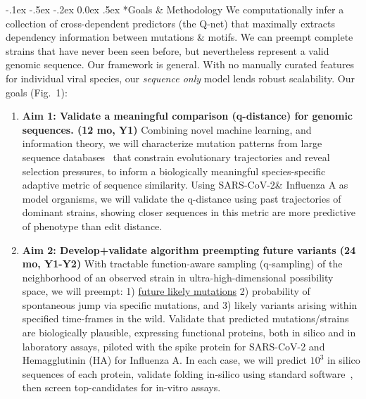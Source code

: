 \documentclass[onecolumn, compsoc,12pt]{IEEEtran}
\makeatletter
\renewcommand\paragraph{\@startsection {section}{1}{\z@}%
                                   {-.1ex \@plus -.5ex \@minus -.2ex}%
                                   {0.0ex \@plus.5ex}%
                                   {\fontsize{11}{10}\selectfont\bfseries\itshape\sffamily\color{black}}}
\def\hcov{SARS-CoV-2\xspace}
\def\infl{Influenza A\xspace}
\makeatother
\begin{document}
\paragraph*{Goals \& Methodology}
We computationally infer a collection of cross-dependent predictors (the Q-net) that maximally extracts dependency information between mutations \& motifs. We can preempt complete strains that have never been seen before, but nevertheless represent a valid genomic sequence. Our framework is general. With no manually curated features for  individual viral species, our \textit{sequence only} model lends robust scalability. 
Our goals (Fig.~1): \begin{enumerate} 
[label=$\square$, leftmargin=0pt,
labelindent=0em, topsep=0.1em, labelsep=*, itemsep=.25em,itemindent=1em]

\item \textbf{Aim 1: Validate  a meaningful comparison (q-distance) for genomic sequences. (12 mo, Y1)}  Combining novel machine learning, and  information theory, we will  characterize  mutation patterns  from large sequence databases~\cite{Hatcher_2016} that constrain evolutionary trajectories and reveal selection pressures,  to inform a biologically meaningful species-specific adaptive metric of sequence similarity. Using \hcov \& \infl as model organisms, we will validate the q-distance using past trajectories  of dominant strains, showing closer sequences in this metric are more predictive of phenotype than edit distance.%
%
\item \textbf{Aim 2: Develop+validate  algorithm preempting future variants (24 mo, Y1-Y2) } With  tractable function-aware sampling (q-sampling) of the neighborhood of an observed strain in ultra-high-dimensional  possibility space, we will preempt: 1) \uline{future likely mutations} 2) probability of spontaneous jump  via specific mutations, and 3)  likely variants arising within specified time-frames in the wild. Validate  that predicted mutations/strains  are biologically plausible,  expressing functional proteins, both  in silico and in laboratory assays, piloted with the spike protein for \hcov and Hemagglutinin (HA) for Influenza A. In each case, we will predict $10^3$ in silico sequences of each protein, validate  folding in-silico using standard software~\cite{bagdonas2021case}, then screen top-candidates for in-vitro assays.

\end{enumerate}
\end{document}
